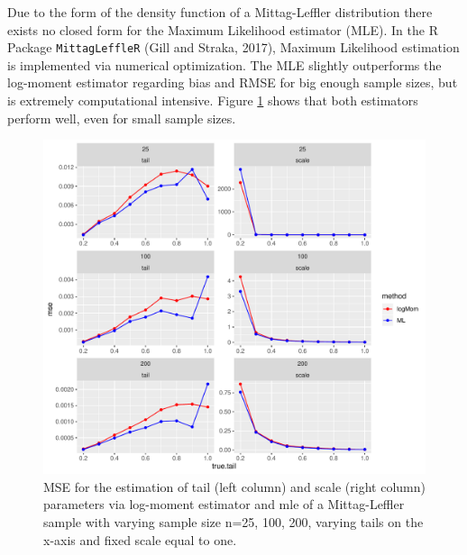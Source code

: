 \documentclass[]{elsarticle} %
\begin{document}
Due to the form of the density function of a Mittag-Leffler distribution
there exists no closed form for the Maximum Likelihood estimator (MLE).
In the R Package \texttt{MittagLeffleR} (Gill and Straka, 2017), Maximum
Likelihood estimation is implemented via numerical optimization. The MLE
slightly outperforms the log-moment estimator regarding bias and RMSE
for big enough sample sizes, but is extremely computational intensive.
Figure \ref{fig:MSE} shows that both estimators perform well, even for
small sample sizes.

\begin{figure}

{\centering \includegraphics[width=0.9\linewidth]{article_springer_files/figure-latex/MSE-1} 

}

\caption{\label{fig:MSE} MSE for the estimation of tail (left column) and scale (right column) parameters via log-moment estimator and mle of a Mittag-Leffler sample with varying sample size n=25, 100, 200, varying tails on the x-axis and fixed scale equal to one.}\label{fig:MSE}
\end{figure}
\end{document}
